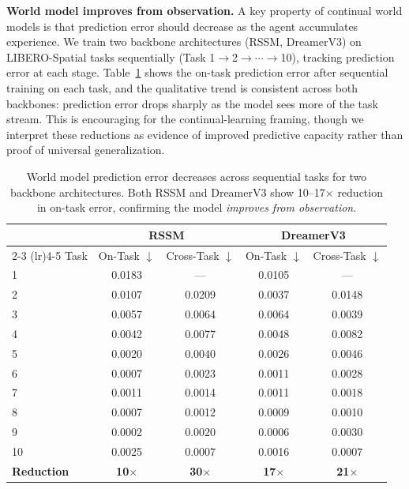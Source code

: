 \documentclass{article}
\begin{document}
\textbf{World model improves from observation.} A key property of continual world models is that prediction error should decrease as the agent accumulates experience. We train two backbone architectures (RSSM, DreamerV3) on LIBERO-Spatial tasks sequentially (Task 1$\to$2$\to$$\cdots$$\to$10), tracking prediction error at each stage. Table~\ref{tab:wm_improvement} shows the on-task prediction error after sequential training on each task, and the qualitative trend is consistent across both backbones: prediction error drops sharply as the model sees more of the task stream. This is encouraging for the continual-learning framing, though we interpret these reductions as evidence of improved predictive capacity rather than proof of universal generalization.

\begin{table}[h]
\centering
\caption{World model prediction error decreases across sequential tasks for two backbone architectures. Both RSSM and DreamerV3 show 10--17$\times$ reduction in on-task error, confirming the model \emph{improves from observation}.}
\label{tab:wm_improvement}
\small
\begin{tabular}{lcccc}
\toprule
 & \multicolumn{2}{c}{RSSM} & \multicolumn{2}{c}{DreamerV3} \\
\cmidrule(lr){2-3} \cmidrule(lr){4-5}
Task & On-Task $\downarrow$ & Cross-Task $\downarrow$ & On-Task $\downarrow$ & Cross-Task $\downarrow$ \\
\midrule
1 & 0.0183 & --- & 0.0105 & --- \\
2 & 0.0107 & 0.0209 & 0.0037 & 0.0148 \\
3 & 0.0057 & 0.0064 & 0.0064 & 0.0039 \\
4 & 0.0042 & 0.0077 & 0.0048 & 0.0082 \\
5 & 0.0020 & 0.0040 & 0.0026 & 0.0046 \\
6 & 0.0007 & 0.0023 & 0.0011 & 0.0028 \\
7 & 0.0011 & 0.0014 & 0.0011 & 0.0018 \\
8 & 0.0007 & 0.0012 & 0.0009 & 0.0010 \\
9 & 0.0002 & 0.0020 & 0.0006 & 0.0030 \\
10 & 0.0025 & 0.0007 & 0.0016 & 0.0007 \\
\midrule
\textbf{Reduction} & \textbf{10$\times$} & \textbf{30$\times$} & \textbf{17$\times$} & \textbf{21$\times$} \\
\bottomrule
\end{tabular}
\end{table}
\end{document}
